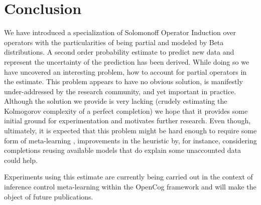\documentclass[runningheads]{llncs}
\begin{document}
\section{Conclusion}
\label{con}
We have introduced a specialization of Solomonoff Operator Induction
over operators with the particularities of being partial and modeled
by Beta distributions. A second order probability estimate to predict
new data and represent the uncertainty of the prediction has been
derived. While doing so we have uncovered an interesting problem, how
to account for partial operators in the estimate. This problem appears
to have no obvious solution, is manifestly under-addressed by the
research community, and yet important in practice. Although the
solution we provide is very lacking (crudely estimating the Kolmogorov
complexity of a perfect completion) we hope that it provides some
initial ground for experimentation and motivates further research.
Even though, ultimately, it is expected that this problem might be
hard enough to require some form of meta-learning
\cite{Goertzel16Probabilistic}, improvements in the heuristic by, for
instance, considering completions reusing available models that do
explain some unaccounted data could help.

Experiments using this estimate are currently being carried out in the
context of inference control meta-learning within the OpenCog
framework and will make the object of future publications.

%
%


\end{document}
